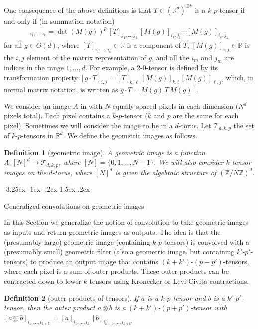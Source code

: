 \documentclass{article}
\makeatletter
\theoremstyle{plain}
\newtheorem{definition}{Definition}
\newcommand{\sectionname}{Section}
\renewcommand\section{\@startsection {section}{1}{\z@}%
  {-3.25ex \@plus -1ex \@minus -.2ex}%
  {1.5ex \@plus .2ex}%
  {\raggedright\normalfont\large\bfseries}}
\makeatother
\begin{document}
One consequence of the above definitions is that 
$T\in (\mathbb R^d)^{\otimes k}$ is a $k$-$p$-tensor if and only if (in summation notation)
\begin{align}
    [g\cdot T]_{i_1,\ldots, i_k} = \det(M(g))^p\, [T]_{j_1,\ldots,j_k}\,[M(g)]_{i_1,j_1}\cdots[M(g)]_{i_k,j_k}
\end{align} for all $g\in O(d)$, where $[T]_{i_1, \ldots ,i_k} \in \mathbb R$ is a component of $T$, $[M(g)]_{i,j}\in\mathbb R$ is the $i,j$ element of the matrix representation of $g$, and all the $i_m$ and $j_m$ are indices in the range $1,\ldots,d$.
For example, a 2-0-tensor is defined by its transformation property
$[g\cdot T]_{i,j} = [T]_{k,\ell}\,[M(g)]_{k,i}\,[M(g)]_{\ell,j}$,
which, in normal matrix notation, is written as
$g\cdot T = M(g)\,T\,M(g)^\top$.

We consider an image $A$ in with $N$ equally spaced pixels in each dimension ($N^d$ pixels total). Each pixel contains a $k$-$p$-tensor ($k$ and $p$ are the same for each pixel). Sometimes we will consider the image to be in a $d$-torus. 
Let $\mathcal T_{d,k,p}$ the set of $k$-$p$-tensors in $\mathbb R^d$. We define the geometric images as follows.
\begin{definition}[geometric image]
A geometric image is a function $A:[N]^d \to \mathcal T_{d,k,p}$, where $[N]=\{0,1,\ldots, N-1\}$. We will also consider $k$-tensor images on the $d$-torus, where $[N]^d$ is given the algebraic structure of $(\mathbb Z / N\mathbb Z)^d$.
\end{definition}

\section{Generalized convolutions on geometric images}\label{sec:convolution}

In this \sectionname{} we generalize the notion of convolution to take geometric images as inputs and return geometric images as outputs.
The idea is that the (presumably large) geometric image (containing $k$-$p$-tensors) is convolved with a (presumably small) geometric filter (also a geometric image, but containing $k'$-$p'$-tensors) to produce an output image that contains $(k+k')$-$(p+p')$-tensors, where each pixel is a sum of outer products.
These outer products can be contracted down to lower-$k$ tensors using Kronecker or Levi-Civita contractions.

\begin{definition}[outer products of tensors]
If $a$ is a $k$-$p$-tensor and $b$ is a $k'$-$p'$-tensor, then the outer product $a\otimes b$ is a $(k+k')$-$(p+p')$-tensor with $[a\otimes b]_{i_1,\ldots,i_{k+k'}} = [a]_{i_1,\ldots,i_k}\,[b]_{i_{k+1},\ldots,i_{k+k'}}$
\end{definition}
\end{document}
